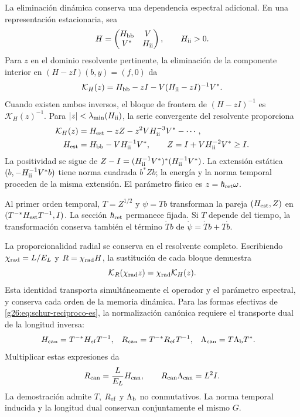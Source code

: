La eliminación dinámica conserva una dependencia espectral adicional.
En una representación estacionaria, sea
\[
 H=\begin{pmatrix}H_{\rm bb}&V\\V^*&H_{\rm ii}\end{pmatrix},
 \qquad H_{\rm ii}>0.
\]
Para \(z\) en el dominio resolvente pertinente, la eliminación de la
componente interior en \((H-zI)(b,y)=(f,0)\) da
\begin{equation}
 \mathcal K_H(z)=H_{\rm bb}-zI
       -V(H_{\rm ii}-zI)^{-1}V^*.
 \label{g26:eq:resolvente-memoria-es}
\end{equation}
Cuando existen ambos inversos, el bloque de frontera de
\((H-zI)^{-1}\) es \(\mathcal K_H(z)^{-1}\). Para
\(|z|<\lambda_{\min}(H_{\rm ii})\), la serie convergente del
resolvente proporciona
\begin{align}
 \mathcal K_H(z)&=H_{\rm est}-zZ-z^2VH_{\rm ii}^{-3}V^*-\cdots,
 \label{g26:eq:expansion-resolvente-es}\\
 H_{\rm est}&=H_{\rm bb}-VH_{\rm ii}^{-1}V^*,\qquad
 Z=I+VH_{\rm ii}^{-2}V^*\geq I.
 \label{g26:eq:norma-z-es}
\end{align}
La positividad se sigue de
\(Z-I=(H_{\rm ii}^{-1}V^*)^*(H_{\rm ii}^{-1}V^*)\).
La extensión estática \((b,-H_{\rm ii}^{-1}V^*b)\) tiene norma
cuadrada \(b^*Zb\); la energía y la norma temporal proceden de la
misma extensión. El parámetro físico es \(z=\hbar_{\rm ret}\omega\).

Al primer orden temporal, \(T=Z^{1/2}\) y \(\psi=Tb\) transforman
la pareja \((H_{\rm est},Z)\) en
\((T^{-*}H_{\rm est}T^{-1},I)\). La sección
\(\hbar_{\rm ret}\) permanece fijada. Si \(T\) depende del tiempo,
la transformación conserva también el término \(\dot T b\) de
\(\dot\psi=\dot T b+T\dot b\).

La proporcionalidad radial se conserva en el resolvente completo.
Escribiendo \(\chi_{\rm rad}=L/E_{L}\) y \(R=\chi_{\rm rad} H\), la sustitución de
cada bloque demuestra
\begin{equation}
 \mathcal K_R(\chi_{\rm rad} z)=\chi_{\rm rad}\mathcal K_H(z).
 \label{g26:eq:resolvente-proporcional-es}
\end{equation}
Esta identidad transporta simultáneamente el operador y el parámetro
espectral, y conserva cada orden de la memoria dinámica. Para las formas
efectivas de \eqref{g26:eq:schur-reciproco-es}, la normalización canónica
requiere el transporte dual de la longitud inversa:
\begin{align*}
 H_{\rm can}&=T^{-*}H_{\rm ef}T^{-1},&
 R_{\rm can}&=T^{-*}R_{\rm ef}T^{-1},&
 \Lambda_{\rm can}&=T\Lambda_{\rm b}T^*.
\end{align*}
Multiplicar estas expresiones da
\[
 R_{\rm can}=\frac{L}{E_{L}}H_{\rm can},\qquad
 R_{\rm can}\Lambda_{\rm can}=L^2I.
\]
La demostración admite \(T\), \(R_{\rm ef}\) y
\(\Lambda_{\rm b}\) no conmutativos. La norma temporal inducida y
la longitud dual conservan conjuntamente el mismo \(G\).

